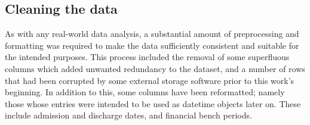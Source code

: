 \subsection{Cleaning the data}\label{subsec:formatting}

As with any real-world data analysis, a substantial amount of preprocessing and
formatting was required to make the data sufficiently consistent and suitable
for the intended purposes. This process included the removal of some superfluous
columns which added unwanted redundancy to the dataset, and a number of rows
that had been corrupted by some external storage software prior to this work's
beginning. In addition to this, some columns have been reformatted; namely those
whose entries were intended to be used as datetime objects later on. These
include admission and discharge dates, and financial bench periods.
